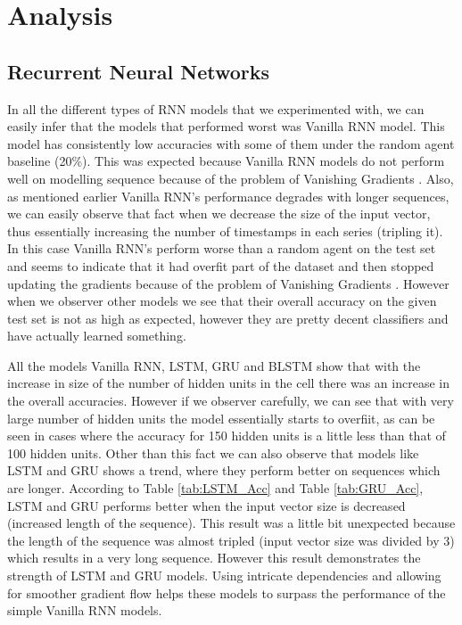 \documentclass[letterpaper, 12 pt, conference]{ieeeconf}  %
\begin{document}



\section{\textbf{Analysis}}

\subsection{\textbf{Recurrent Neural Networks}}
In all the different types of RNN models that we experimented with, we can easily infer that the models that performed worst was Vanilla RNN model. This model has consistently low accuracies  with some of them under the random agent baseline (20\%). This was expected because Vanilla RNN models do not perform well on modelling sequence because of the problem of Vanishing Gradients \cite{vanishing_gradient}. Also, as mentioned earlier Vanilla RNN's performance degrades with longer sequences, we can easily observe that fact when we decrease the size of the input vector, thus essentially increasing the number of timestamps in each series (tripling it). In this case Vanilla RNN's perform worse than a random agent on the test set and seems to indicate that it had overfit part of the dataset and then stopped updating the gradients because of the problem of Vanishing Gradients \cite{vanishing_gradient}. However when we observer other models we see that their overall accuracy on the given test set is not as high as expected, however they are pretty decent classifiers and have actually learned something.

All the models Vanilla RNN, LSTM, GRU and BLSTM show that with the increase in size of the number of hidden units in the cell there was an increase in the overall accuracies. However if we observer carefully, we can see that with very large number of hidden units the model essentially starts to overfiit, as can be seen in cases where the accuracy for 150 hidden units is a little less than that of 100 hidden units. Other than this fact we can also observe that models like LSTM and GRU shows a trend, where they perform better on sequences which are longer. According to Table \ref{tab:LSTM_Acc} and Table \ref{tab:GRU_Acc}, LSTM and GRU performs better when the input vector size is decreased (increased length of the sequence). This result was a little bit unexpected because the length of the sequence was almost tripled (input vector size was divided by 3) which results in a very long sequence. However this result demonstrates the strength of LSTM and GRU models. Using intricate dependencies and allowing for smoother gradient flow helps these models to surpass the performance of the simple Vanilla RNN models.
\end{document}
